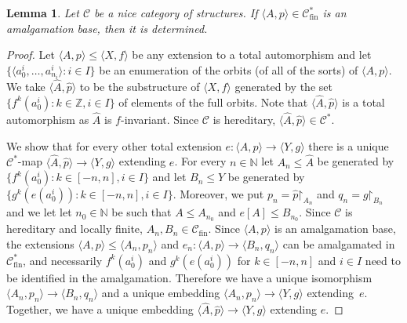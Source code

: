 \documentclass[oneside,notitlepage,12pt]{article}
\newtheorem{lm}[tw]{Lemma}
\theoremstyle{definition}
\theoremstyle{remark}
\newcommand \set [1]{\{#1\}}
\newcommand \seq [1]{\langle #1 \rangle}
\newcommand \maps {\colon} %
\newcommand \im [1]{[#1]} %
\newcommand \restr [1] {\mathord{\upharpoonright}_{#1}}
\newcommand \N {\mathbb{N}}
\newcommand \Z {\mathbb{Z}}
\newcommand \C {\mathscr{C}}
\newcommand \fin {{\operatorname{fin}}}
\begin{document}
\begin{lm} \label{thm:amalgamation_base_determined}
    Let $\C$ be a nice category of structures.
    If $\seq{A, p} \in \C^*_\fin$ is an amalgamation base, then it is determined.
\end{lm}
\begin{proof}
    Let $\seq{A, p} \leq \seq{X, f}$ be any extension to a total automorphism and let $\set{\seq{a^i_0, \ldots, a^i_{n_i}}\colon i \in I}$ be an enumeration of the orbits (of all of the sorts) of $\seq{A, p}$.
    We take $\seq{\hat{A}, \hat{p}}$ to be the substructure of $\seq{X, f}$ generated by the set $\set{f^k(a^i_0): k \in \Z, i \in I}$ of elements of the full orbits.
    Note that $\seq{\hat{A}, \hat{p}}$ is a total automorphism as $\hat{A}$ is $f$-invariant.
    Since $\C$ is hereditary, $\seq{\hat{A}, \hat{p}} \in \C^*$.

    We show that for every other total extension $e\maps \seq{A, p} \to \seq{Y, g}$ there is a unique $\C^*$-map $\seq{\hat{A}, \hat{p}} \to \seq{Y, g}$ extending $e$.
    For every $n \in \N$ let $A_n \leq \hat{A}$ be generated by $\set{f^k(a^i_0): k \in [-n, n], i \in I}$ and let $B_n \leq Y$ be generated by $\set{g^k(e(a^i_0)): k \in [-n, n], i \in I}$.
    Moreover, we put $p_n = \hat{p}\restr{A_n}$ and $q_n = g\restr{B_n}$ and we let let $n_0 \in \N$ be such that $A \leq A_{n_0}$ and $e\im{A} \leq B_{n_0}$.
    Since $\C$ is hereditary and locally finite, $A_n, B_n \in \C_\fin$.
    Since $\seq{A, p}$ is an amalgamation base, the extensions $\seq{A, p} \leq \seq{A_n, p_n}$ and $e_n\maps \seq{A, p} \to \seq{B_n, q_n}$ can be amalgamated in $\C_\fin^*$, and necessarily $f^k(a^i_0)$ and $g^k(e(a^i_0))$ for $k \in [-n, n]$ and $i \in I$ need to be identified in the amalgamation. Therefore we have a unique isomorphism $\seq{A_n, p_n} \to \seq{B_n, q_n}$ and a unique embedding $\seq{A_n, p_n} \to \seq{Y, g}$ extending~$e$.
    Together, we have a unique embedding $\seq{\hat{A}, \hat{p}} \to \seq{Y, g}$ extending $e$.
\end{proof}
\end{document}
